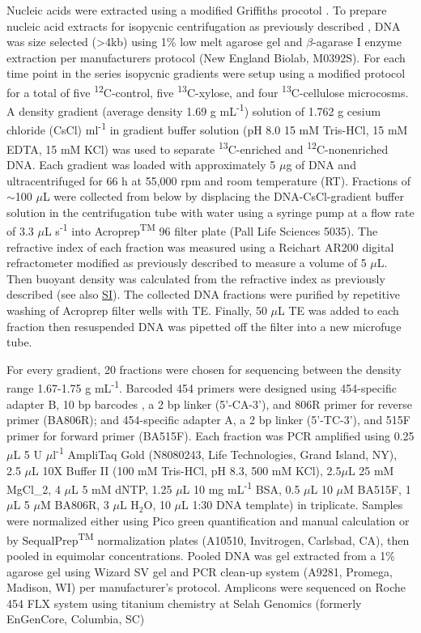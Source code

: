 Nucleic acids were extracted using a modified Griffiths procotol \cite{Griffiths_2000}. To prepare nucleic acid extracts for isopycnic centrifugation as previously described \cite{Buckley_2007}, DNA was size selected (\textgreater 4kb) using 1\% low melt agarose gel and $\beta$-agarase I enzyme extraction per manufacturers protocol (New England Biolab, M0392S). For each time point in the series isopycnic gradients were setup using a modified protocol \cite{Neufeld_2007} for a total of five \textsuperscript{12}C-control, five \textsuperscript{13}C-xylose, and four \textsuperscript{13}C-cellulose microcosms. A density gradient (average density 1.69 g mL\textsuperscript{-1}) solution of 1.762 g cesium chloride (CsCl) ml\textsuperscript{-1} in gradient buffer solution (pH 8.0 15 mM Tris-HCl, 15 mM EDTA, 15 mM KCl) was used to separate \textsuperscript{13}C-enriched and \textsuperscript{12}C-nonenriched DNA. Each gradient was loaded with approximately 5 $\mu$g of DNA and ultracentrifuged for 66 h at 55,000 rpm and room temperature (RT). Fractions of $\sim$100 $\mu$L were collected from below by displacing the DNA-CsCl-gradient buffer solution in the centrifugation tube with water using a syringe pump at a flow rate of 3.3 $\mu$L s\textsuperscript{-1} \cite{Manefield_2002} into Acroprep\textsuperscript{TM} 96 filter plate (Pall Life Sciences 5035). The refractive index of each fraction was measured using a Reichart AR200 digital refractometer modified as previously described \cite{Buckley_2007} to measure a volume of 5 $\mu$L. Then buoyant density was calculated from the refractive index as previously described \cite{Buckley_2007} (see also \href{https://authorea.com/users/3537/articles/8459/_show_article}{SI}). The collected DNA fractions were purified by repetitive washing of Acroprep filter wells with TE. Finally, 50 $\mu$L TE was added to each fraction then resuspended DNA was pipetted off the filter into a new microfuge tube. 


For every gradient, 20 fractions were chosen for sequencing between the density range 1.67-1.75 g mL\textsuperscript{-1}. Barcoded 454 primers were designed using 454-specific adapter B, 10 bp barcodes \cite{Hamady_2008}, a 2 bp linker (5'-CA-3'), and 806R primer for reverse primer (BA806R); and 454-specific adapter A, a 2 bp linker  (5'-TC-3'), and 515F primer for forward primer (BA515F). Each fraction was PCR amplified using 0.25 $\mu$L 5 U $\mu$l\textsuperscript{-1} AmpliTaq Gold (N8080243, Life Technologies, Grand Island, NY), 2.5 $\mu$L 10X Buffer II (100 mM Tris-HCl, pH 8.3, 500 mM KCl), 2.5$\mu$L 25 mM MgCl_{2}, 4 $\mu$L 5 mM dNTP, 1.25 $\mu$L 10 mg mL\textsuperscript{-1} BSA, 0.5 $\mu$L 10 $\mu$M BA515F, 1 $\mu$L 5 $\mu$M BA806R, 3 $\mu$L H$_{2}$O, 10 $\mu$L 1:30 DNA template) in triplicate. Samples were normalized either using Pico green quantification and manual calculation or by SequalPrep\textsuperscript{TM} normalization plates (A10510, Invitrogen, Carlsbad, CA), then pooled in equimolar concentrations.  Pooled DNA was gel extracted from a 1\% agarose gel using Wizard SV gel and PCR clean-up system (A9281, Promega, Madison, WI) per manufacturer's protocol.  Amplicons were sequenced on Roche 454 FLX system using titanium chemistry at Selah Genomics (formerly EnGenCore, Columbia, SC)  
